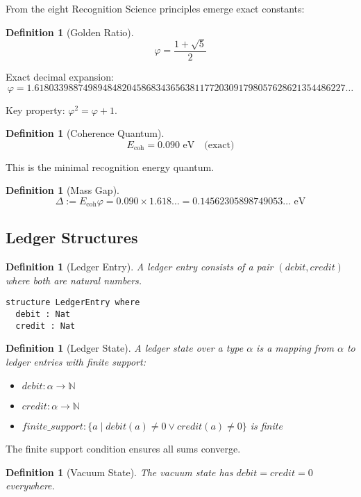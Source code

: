 \documentclass[11pt]{article}
\numberwithin{equation}{section}
\newtheorem{definition}[theorem]{Definition}
\theoremstyle{remark}
\newcommand{\Ecoh}{E_{\text{coh}}}
\newcommand{\massGap}{\Delta}
\newcommand{\N}{\mathbb{N}}
\begin{document}
From the eight Recognition Science principles emerge exact constants:

\begin{definition}[Golden Ratio]
\[\varphi = \frac{1 + \sqrt{5}}{2}\]
\end{definition}

Exact decimal expansion:
\[\varphi = 1.6180339887498948482045868343656381177203091798057628621354486227\ldots\]

Key property: $\varphi^2 = \varphi + 1$.

\begin{definition}[Coherence Quantum]
\[\Ecoh = 0.090 \text{ eV} \quad \text{(exact)}\]
\end{definition}

This is the minimal recognition energy quantum.

\begin{definition}[Mass Gap]
\[\massGap := \Ecoh \varphi = 0.090 \times 1.618\ldots = 0.14562305898749053\ldots \text{ eV}\]
\end{definition}

\subsection{Ledger Structures}

\begin{definition}[Ledger Entry]
A ledger entry consists of a pair $(debit, credit)$ where both are natural numbers.
\begin{lstlisting}
structure LedgerEntry where
  debit : Nat
  credit : Nat
\end{lstlisting}
\end{definition}

\begin{definition}[Ledger State]
A ledger state over a type $\alpha$ is a mapping from $\alpha$ to ledger entries with finite support:
\begin{itemize}
\item $debit : \alpha \to \N$
\item $credit : \alpha \to \N$  
\item $finite\_support : \{a \mid debit(a) \neq 0 \vee credit(a) \neq 0\}$ is finite
\end{itemize}
\end{definition}

The finite support condition ensures all sums converge.

\begin{definition}[Vacuum State]
The vacuum state has $debit = credit = 0$ everywhere.
\end{definition}
\end{document}
